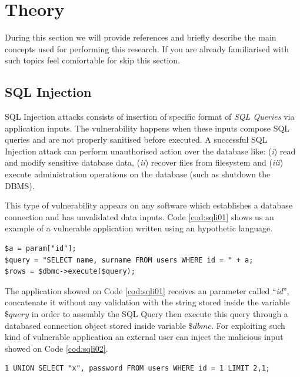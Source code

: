 \section{Theory}\label{sec:the}
During this section we will provide references and briefly describe the main concepts used for performing this research. If you are already familiarised with such topics feel comfortable for skip this section. 

\subsection{SQL Injection}
SQL Injection attacks consists of insertion of specific format of \textit{SQL Queries} via application inputs. The vulnerability happens when these inputs compose SQL queries and are not properly sanitised before executed. A successful SQL Injection attack can perform unauthorised action over the database like: (\textit{i}) read and modify sensitive database data, (\textit{ii}) recover files from filesystem and (\textit{iii}) execute administration operations on the database (such as shutdown the DBMS). 

This type of vulnerability appears on any software which establishes a database connection and has unvalidated data inputs. Code \ref{cod:sqli01} shows us an example of a vulnerable application written using an hypothetic language.

\lstset{frame=single, captionpos=b, numbers=left, stepnumber=1, tabsize=2, basicstyle=\footnotesize\ttfamily,numberstyle=\tiny, numbersep=5pt}
\begin{lstlisting}[caption=SQL Injection vulnerable code example,label=cod:sqli01]
$a = param["id"];
$query = "SELECT name, surname FROM users WHERE id = " + a;
$rows = $dbmc->execute($query);
\end{lstlisting}

The application showed on Code \ref{cod:sqli01} receives an parameter called ``\textit{id}'', concatenate it without any validation with the string stored inside the variable $\$query$ in order to assembly the SQL Query then execute this query through a databased connection object stored inside variable $\$dbmc$. For exploiting such kind of vulnerable application an external user can inject the malicious input showed on Code \ref{cod:sqli02}. 

\begin{lstlisting}[caption=malicious input,label=cod:sqli02]
1 UNION SELECT "x", password FROM users WHERE id = 1 LIMIT 2,1;
\end{lstlisting}

